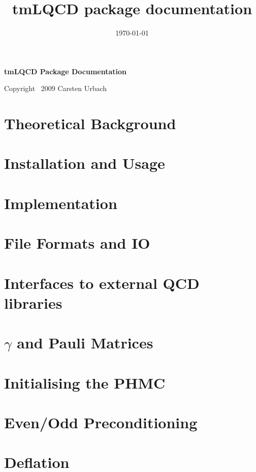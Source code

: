 \documentclass[a4paper,12pt,dvips]{article}
\date{\today}
\title{tmLQCD package documentation}
\begin{document}
\begin{center}
  {\Large\bf tmLQCD Package Documentation}\\
\end{center}

\tableofcontents

\begin{flushright}
  Copyright \textcopyright\ 2009 Carsten Urbach
\end{flushright}

\section{Theoretical Background}


\section{Installation and Usage}


\section{Implementation}




\section{File Formats and IO}

\section{Interfaces to external QCD libraries}

\clearpage


\clearpage

\begin{appendix}
  \section{$\gamma$  and Pauli  Matrices}

  \section{Initialising the PHMC}
  \section{Even/Odd Preconditioning}

  \section{Deflation}
\end{appendix}
\end{document}
